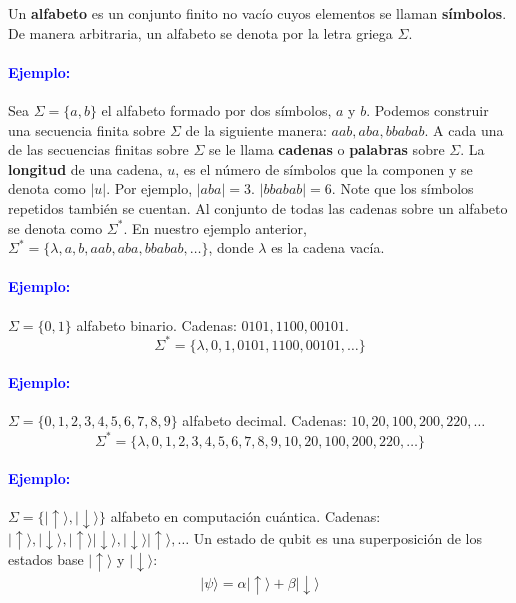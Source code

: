 \documentclass[12pt]{article}
\begin{document}
	\begin{definicion}[Alfabeto]
	Un \textbf{alfabeto} es un conjunto finito no vacío cuyos elementos se llaman \textbf{símbolos}.
	De manera arbitraria, un alfabeto se denota por la letra griega $\Sigma$.
	\end{definicion}

\paragraph{\textcolor{blue}{Ejemplo:}}
Sea $\Sigma = \{a, b\}$ el alfabeto formado por dos símbolos, $a$ y $b$.
Podemos construir una secuencia finita sobre $\Sigma$ de la siguiente manera:
$aab, aba, bbabab$. A cada una de las secuencias finitas sobre $\Sigma$ se le llama \textbf{cadenas} 
o \textbf{palabras} sobre $\Sigma$. La \textbf{longitud} de una cadena, $u$, es el 
número de símbolos que la componen y se denota como $|u|$. 
Por ejemplo, $|aba| = 3$. $|bbabab| = 6$. Note que los símbolos repetidos también 
se cuentan. Al conjunto de todas las cadenas sobre un alfabeto se denota como $\Sigma^*$.
En nuestro ejemplo anterior, $\Sigma^* = \{\lambda, a, b, aab, aba, bbabab, \dots\}$, 
donde $\lambda$ es la cadena vacía.  

\paragraph{\textcolor{blue}{Ejemplo:}}
$\Sigma = \{0, 1\}$ alfabeto binario. Cadenas: $0101, 1100, 00101$.
$$\Sigma^* = \{\lambda, 0, 1, 0101,  1100, 00101, \dots\}$$

\paragraph{\textcolor{blue}{Ejemplo:}}
$\Sigma = \{0, 1, 2, 3, 4, 5, 6, 7, 8, 9\}$ alfabeto decimal.
Cadenas: $
10, 20, 100, 200, 220, \dots$
$$\Sigma^* = \{\lambda, 0, 1, 2, 3, 4, 5, 6, 7, 8, 9, 10, 20, 100, 200, 220, \dots\}$$

\paragraph{\textcolor{blue}{Ejemplo:}}
$\Sigma = \{ |\uparrow\rangle, |\downarrow\rangle \}$ alfabeto en computación cuántica. 
Cadenas: $|\uparrow\rangle, |\downarrow\rangle, |\uparrow\rangle |\downarrow\rangle, |\downarrow\rangle |\uparrow\rangle, \dots$
Un estado de qubit es una superposición de los estados base 
$|\uparrow\rangle$ y $|\downarrow\rangle$:
\begin{align*}
|\psi\rangle = \alpha |\uparrow\rangle + \beta |\downarrow\rangle
\end{align*}
\end{document}
